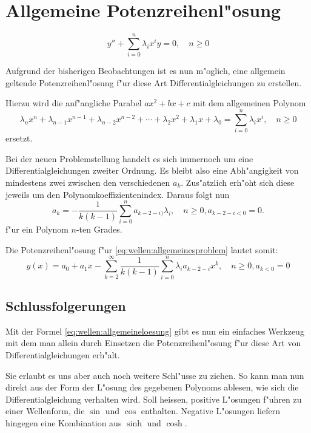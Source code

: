 \section{Allgemeine Potenzreihenl"osung}

\begin{equation}
	y''+\sum_{i=0}^{n}\lambda_ix^i y=0, \quad n \ge 0
	\label{eq:wellen:allgemeinesproblem}
\end{equation}

Aufgrund der bisherigen Beobachtungen ist es nun m"oglich, eine 
allgemein geltende Potenzreihenl"osung f"ur diese Art Differentialgleichungen 
zu erstellen.

Hierzu wird die anf"angliche Parabel $ax^2 + bx + c$ mit dem allgemeinen Polynom
\begin{equation*}
	\lambda_nx^n + \lambda_{n-1}x^{n-1} + \lambda_{n-2}x^{n-2} + \dotsb + 
	\lambda_2x^2 + \lambda_1x + \lambda_0 = \sum_{i=0}^{n}\lambda_ix^i, \quad n 
	\ge 0
\end{equation*}
ersetzt.

Bei der neuen Problemstellung handelt es sich immernoch um eine 
Differentialgleichungen zweiter Ordnung. Es bleibt also eine Abh"angigkeit von 
mindestens zwei zwischen den verschiedenen $a_k$. Zus"atzlich erh"oht sich 
diese jeweils um den Polynomkoeffizientenindex. Daraus folgt nun
\begin{equation*}
	a_k = -\frac{1}{k(k-1)}\sum_{i=0}^{n}a_{k-2-i)}\lambda_i, \quad n \ge 0, 
	a_{k-2-i < 0} =  0.
\end{equation*}
f"ur ein Polynom $n$-ten Grades.

Die Potenzreihenl"osung f"ur \ref{eq:wellen:allgemeinesproblem} lautet somit:
\begin{equation}
	y(x) = a_0 + a_1x - \sum_{k=2}^{\infty}\frac{1}{k(k-1)}\sum_{i=0}^{n}
	\lambda_ia_{k-2-i}x^k, \quad n \ge 0, a_{k < 0} = 0
	\label{eq:wellen:allgemeineloesung}
\end{equation}

\subsection{Schlussfolgerungen}

Mit der Formel \ref{eq:wellen:allgemeineloesung} gibt es nun ein einfaches 
Werkzeug mit dem man allein durch Einsetzen die Potenzreihenl"osung f"ur 
diese Art von Differentialgleichungen erh"alt.

Sie erlaubt es uns aber auch noch weitere Schl"usse zu ziehen. So kann man 
nun direkt aus der Form der L"osung des gegebenen Polynoms ablesen, wie sich 
die Differentialgleichung verhalten wird. Soll heissen, positive L"osungen 
f"uhren zu einer Wellenform, die $\sin$ und $\cos$ enthalten. Negative 
L"osungen liefern hingegen eine Kombination aus $\sinh$ und $\cosh$.

